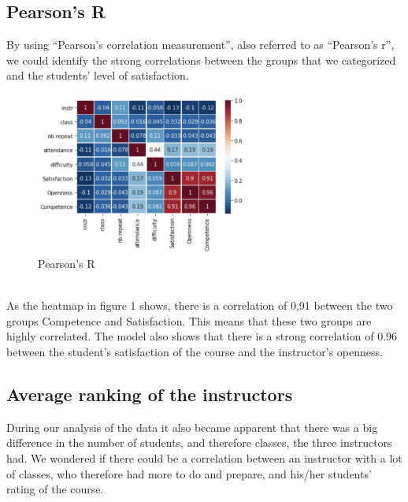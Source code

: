 \documentclass[twocolumn]{article}
\begin{document}
\subsection{Pearson's R}
By using “Pearson’s correlation measurement”\cite{Pearson}, also referred to as “Pearson’s r”, we could identify the strong correlations between the groups that we categorized and the students' level of satisfaction. 
\\
\begin{figure}
\centering
\includegraphics[width=7cm]{Figures/pictures/pearson.png}
\caption{Pearson's R}
\label{fig:pearson}
\end{figure}
\\
As the heatmap in figure 1 shows, there is a correlation of 0,91 between the two groups Competence and Satisfaction. This means that these two groups are highly correlated. The model also shows that there is a strong correlation of 0.96 between the student’s satisfaction of the course and the instructor’s openness.

\subsection{Average ranking of the instructors}
During our analysis of the data it also became apparent that there was a big difference in the number of students, and therefore classes, the three instructors had. We wondered if there could be a correlation between an instructor with a lot of classes, who therefore had more to do and prepare, and his/her students’ rating of the course.
\end{document}
